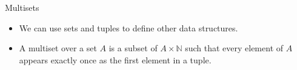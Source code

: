 \begin{frame}[fragile]{Multisets}
  \begin{itemize}
    \setlength\itemsep{3mm}
    \item We can use sets and tuples to define other data structures.
    \item A multiset over a set $A$ is a subset of $A \times \mathbb{N}$ such that every element of $A$ appears exactly once as the first element in a tuple.
  \end{itemize}
\end{frame}